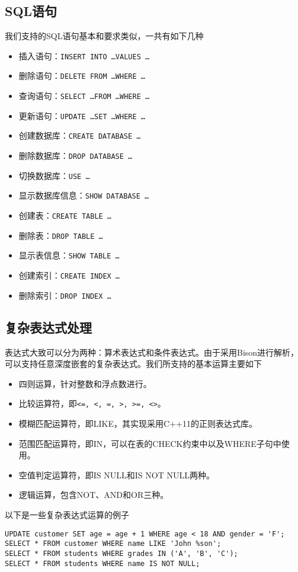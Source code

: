 \documentclass[10pt]{article}
\begin{document}
\subsection{SQL语句}
我们支持的SQL语句基本和要求类似，一共有如下几种
\begin{itemize}
	\item 插入语句：\texttt{INSERT INTO \dots VALUES \dots}
	\item 删除语句：\texttt{DELETE FROM \dots WHERE \dots}
	\item 查询语句：\texttt{SELECT \dots FROM \dots WHERE \dots}
	\item 更新语句：\texttt{UPDATE \dots SET \dots WHERE \dots}
	\item 创建数据库：\texttt{CREATE DATABASE \dots}
	\item 删除数据库：\texttt{DROP DATABASE \dots}
	\item 切换数据库：\texttt{USE \dots}
	\item 显示数据库信息：\texttt{SHOW DATABASE \dots}
	\item 创建表：\texttt{CREATE TABLE \dots}
	\item 删除表：\texttt{DROP TABLE \dots}
	\item 显示表信息：\texttt{SHOW TABLE \dots}
	\item 创建索引：\texttt{CREATE INDEX \dots}
	\item 删除索引：\texttt{DROP INDEX \dots}
\end{itemize}
\subsection{复杂表达式处理}
表达式大致可以分为两种：算术表达式和条件表达式。由于采用Bison进行解析，可以支持任意深度嵌套的复杂表达式。我们所支持的基本运算主要如下
\begin{itemize}
	\item 四则运算，针对整数和浮点数进行。
	\item 比较运算符，即\texttt{<=, <, =, >, >=, <>}。
	\item 模糊匹配运算符，即LIKE，其实现采用C++11的正则表达式库。
	\item 范围匹配运算符，即IN，可以在表的CHECK约束中以及WHERE子句中使用。
	\item 空值判定运算符，即IS NULL和IS NOT NULL两种。
	\item 逻辑运算，包含NOT、AND和OR三种。
\end{itemize}
以下是一些复杂表达式运算的例子
\begin{verbatim}
UPDATE customer SET age = age + 1 WHERE age < 18 AND gender = 'F';
SELECT * FROM customer WHERE name LIKE 'John %son';
SELECT * FROM students WHERE grades IN ('A', 'B', 'C');
SELECT * FROM students WHERE name IS NOT NULL;
\end{verbatim}
\end{document}
